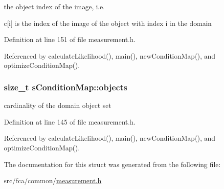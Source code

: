 the object index of the image, i.\-e. 

c\mbox{[}i\mbox{]} is the index of the image of the object with index i in the domain 

\-Definition at line 151 of file measurement.\-h.



\-Referenced by calculate\-Likelihood(), main(), new\-Condition\-Map(), and optimize\-Condition\-Map().

\hypertarget{structsConditionMap_aba0e3734a3c3c6de4f39d9a6c72f3cca}{
\subsubsection[{objects}]{\setlength{\rightskip}{0pt plus 5cm}size\-\_\-t {\bf s\-Condition\-Map\-::objects}}}\label{structsConditionMap_aba0e3734a3c3c6de4f39d9a6c72f3cca}


cardinality of the domain object set 



\-Definition at line 145 of file measurement.\-h.



\-Referenced by calculate\-Likelihood(), main(), new\-Condition\-Map(), and optimize\-Condition\-Map().



\-The documentation for this struct was generated from the following file\-:\begin{DoxyCompactItemize}
\item 
src/fca/common/\hyperlink{common_2measurement_8h}{measurement.\-h}\end{DoxyCompactItemize}
